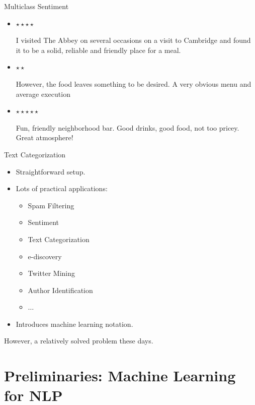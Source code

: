 \documentclass{beamer}
\begin{document}
\begin{frame}{Multiclass Sentiment}
    \begin{itemize}
    \item 
      $\star \star \star \star$

      I visited The Abbey on several occasions on a visit to Cambridge and found it to be a solid, reliable and friendly place for a meal.
      
    \item $\star \star$ 

      However, the food leaves something to be desired. A very obvious menu and average execution

    \item $\star \star \star \star \star$

      Fun, friendly neighborhood bar. Good drinks, good food, not too pricey. Great atmosphere!
  \end{itemize}
\end{frame}





\begin{frame}{Text Categorization}
  \begin{itemize}
  \item Straightforward setup. 
  \item Lots of practical applications:
    \begin{itemize}
    \item Spam Filtering
    \item Sentiment
    \item Text Categorization
    \item e-discovery
    \item Twitter Mining 
    \item Author Identification
    \item $\ldots$
    \end{itemize}
  \item Introduces machine learning notation.
  \end{itemize}

  \vspace{0.24cm}

  However, a relatively solved problem these days.
\end{frame}


\section{Preliminaries: Machine Learning for NLP}
\end{document}
